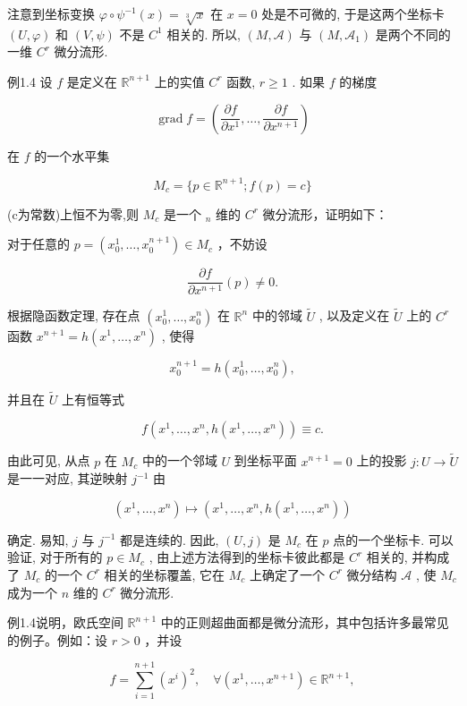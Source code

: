 注意到坐标变换  $\varphi \circ \psi^{-1}(x) = \sqrt[3]{x}$  在  $x = 0$  处是不可微的, 于是这两个坐标卡  $(U, \varphi)$  和  $(V, \psi)$  不是  $C^1$  相关的. 所以,  $(M, \mathcal{A})$  与  $(M, \mathcal{A}_1)$  是两个不同的一维  $C^r$  微分流形.

例1.4 设  $f$  是定义在  $\mathbb{R}^{n+1}$  上的实值  $C^r$  函数,  $r \geqslant 1$ . 如果  $f$  的梯度

$$
\operatorname {g r a d} f = \left(\frac {\partial f}{\partial x ^ {1}}, \dots , \frac {\partial f}{\partial x ^ {n + 1}}\right)
$$

在  $f$  的一个水平集

$$
M _ {c} = \{p \in \mathbb {R} ^ {n + 1}; f (p) = c \}
$$

(c为常数)上恒不为零,则  $M_{c}$  是一个  $_{n}$  维的  $C^r$  微分流形，证明如下：

对于任意的  $p = (x_0^1,\dots ,x_0^{n + 1})\in M_c$  ，不妨设

$$
\frac {\partial f}{\partial x ^ {n + 1}} (p) \neq 0.
$$

根据隐函数定理, 存在点  $(x_0^1,\dots ,x_0^n)$  在  $\mathbb{R}^n$  中的邻域  $\tilde{U}$ , 以及定义在  $\tilde{U}$  上的  $C^r$  函数  $x^{n + 1} = h(x^{1},\dots ,x^{n})$ , 使得

$$
x _ {0} ^ {n + 1} = h \left(x _ {0} ^ {1}, \dots , x _ {0} ^ {n}\right),
$$

并且在  $\tilde{U}$  上有恒等式

$$
f (x ^ {1}, \dots , x ^ {n}, h (x ^ {1}, \dots , x ^ {n})) \equiv c.
$$

由此可见, 从点  $p$  在  $M_{c}$  中的一个邻域  $U$  到坐标平面  $x^{n + 1} = 0$  上的投影  $j: U \to \tilde{U}$  是一一对应, 其逆映射  $j^{-1}$  由

$$
(x ^ {1}, \dots , x ^ {n}) \longmapsto (x ^ {1}, \dots , x ^ {n}, h (x ^ {1}, \dots , x ^ {n}))
$$

确定. 易知,  $j$  与  $j^{-1}$  都是连续的. 因此,  $(U,j)$  是  $M_{c}$  在  $p$  点的一个坐标卡. 可以验证, 对于所有的  $p \in M_{c}$ , 由上述方法得到的坐标卡彼此都是  $C^{r}$  相关的, 并构成了  $M_{c}$  的一个  $C^{r}$  相关的坐标覆盖, 它在  $M_{c}$  上确定了一个  $C^{r}$  微分结构  $\mathcal{A}$ , 使  $M_{c}$  成为一个  $n$  维的  $C^{r}$  微分流形.

例1.4说明，欧氏空间  $\mathbb{R}^{n + 1}$  中的正则超曲面都是微分流形，其中包括许多最常见的例子。例如：设  $r > 0$  ，并设

$$
f = \sum_ {i = 1} ^ {n + 1} (x ^ {i}) ^ {2}, \quad \forall (x ^ {1}, \dots , x ^ {n + 1}) \in \mathbb {R} ^ {n + 1},
$$

